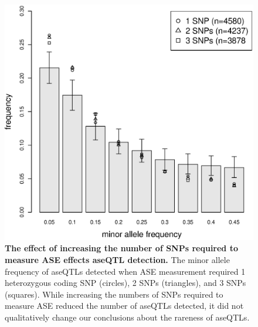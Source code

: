 \begin{figure}[ht]
      \centering
       \includegraphics[width=\linewidth]{Ch3FigS8}
    \caption{\textbf{The effect of increasing the number of SNPs required to measure ASE effects aseQTL detection.} The minor allele frequency of aseQTLs detected when ASE measurement required 1 heterozygous coding SNP (circles), 2 SNPs (triangles), and 3 SNPs (squares). While increasing the numbers of SNPs required to measure ASE reduced the number of aseQTLs detected, it did not qualitatively change our conclusions about the rareness of aseQTLs.}
    \label{fig:3figS8}
\end{figure}

